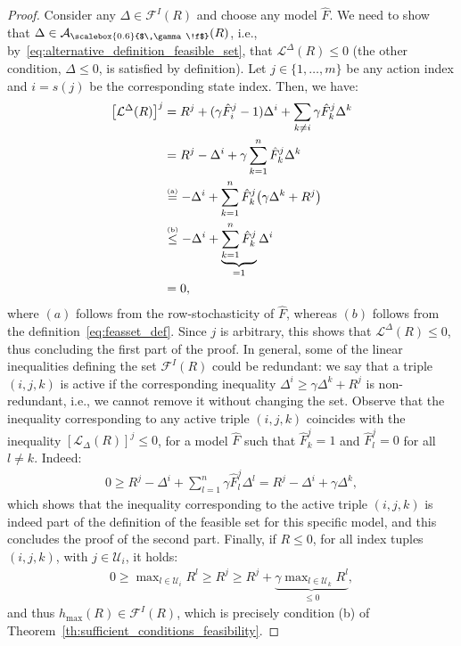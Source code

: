 \documentclass[10pt,leqno]{amsart}
\newcommand{\sml}{\scriptscriptstyle}
\newcommand{\stkrl}[2]{\stackrel{\text{\tiny{(#1)}}}{#2}}
\newcommand{\U}{\mathcal{U}}
\newcommand{\Cost}{R}
\newcommand{\f}{f}
\newcommand{\Fapx}{\hat{F}}
\newcommand{\disc}{\gamma}
\newcommand{\feasset}[1]{\mathcal{A}_{\scalebox{0.6}{$\,\disc\!\f$}}(#1)}
\newcommand{\invset}[1]{\mathcal{F}^{\sml I}(#1)}
\newcommand{\proj}{s}
\newcommand{\outmap}{h_{\sml \text{max}}}
\begin{document}
\begin{proof}
    Consider any $\Delta \in \invset{\Cost}$ and choose any model $\Fapx$. We need to show that $\Delta \in \feasset{\Cost}$, i.e., by~\eqref{eq:alternative_definition_feasible_set}, that $\mathcal{L}^\Delta(\Cost) \leq 0$ (the other condition, $\Delta \leq 0$, is satisfied by definition). Let $j \in \{1, \hdots, m\}$ be any action index and $i = \proj(j)$ be the corresponding state index. Then, we have:
    \begin{align*}
        \bigl[\mathcal{L}^\Delta(\Cost)\bigr]^j &= \Cost^j + (\disc\Fapx_i^j - 1)\Delta^i + \sum_{k \neq i} \disc\Fapx_k^j \Delta^k\\
        &= \Cost^j - \Delta^i + \disc \sum_{k = 1}^n \Fapx_k^j \Delta^k\\
        &\stkrl{a}{=} - \Delta^i + \sum_{k = 1}^n \Fapx_k^j \bigl(\disc \Delta^k + \Cost^j\bigr)\\
        &\stkrl{b}{\leq} -\Delta^i + \underbrace{\sum_{k = 1}^n \Fapx_k^j}_{= 1} \Delta^i\\
        &= 0,
    \end{align*}
    where $(a)$ follows from the row-stochasticity of $\Fapx$, whereas $(b)$ follows from the definition~\eqref{eq:feasset_def}. Since $j$ is arbitrary, this shows that $\mathcal{L}^\Delta(\Cost) \leq 0$, thus concluding the first part of the proof. In general, some of the linear inequalities defining the set $\invset{\Cost}$ could be redundant: we say that a triple $(i, j, k)$ is active if the corresponding inequality $\Delta^i \geq \disc \Delta^k + \Cost^j$ is non-redundant, i.e., we cannot remove it without changing the set. Observe that the inequality corresponding to any active triple $(i, j, k)$ coincides with the inequality $[\mathcal{L}_\Delta(\Cost)]^j \leq 0$, for a model $\Fapx$ such that $\Fapx_k^j = 1$ and $\Fapx_l^j = 0$ for all $l \neq k$. Indeed:
    \begin{align*}
        0 \geq \Cost^j - \Delta^i + \sum_{l = 1}^n \disc \Fapx_l^j \Delta^l = \Cost^j - \Delta^i + \disc \Delta^k,
    \end{align*}
    which shows that the inequality corresponding to the active triple $(i, j, k)$ is indeed part of the definition of the feasible set for this specific model, and this concludes the proof of the second part. Finally, if $\Cost \leq 0$, for all index tuples $(i, j, k)$, with $j\in \U_i$, it holds:
    \begin{align*}
        0 \geq \max\nolimits_{l \in \U_i} \Cost^l \geq \Cost^j \geq \Cost^j + \underbrace{\disc \max\nolimits_{l \in \U_k} \Cost^l}_{\leq 0},
    \end{align*}
    and thus $\outmap(\Cost) \in \invset{\Cost}$, which is precisely condition (b) of Theorem~\ref{th:sufficient_conditions_feasibility}.
\end{proof}
\end{document}
